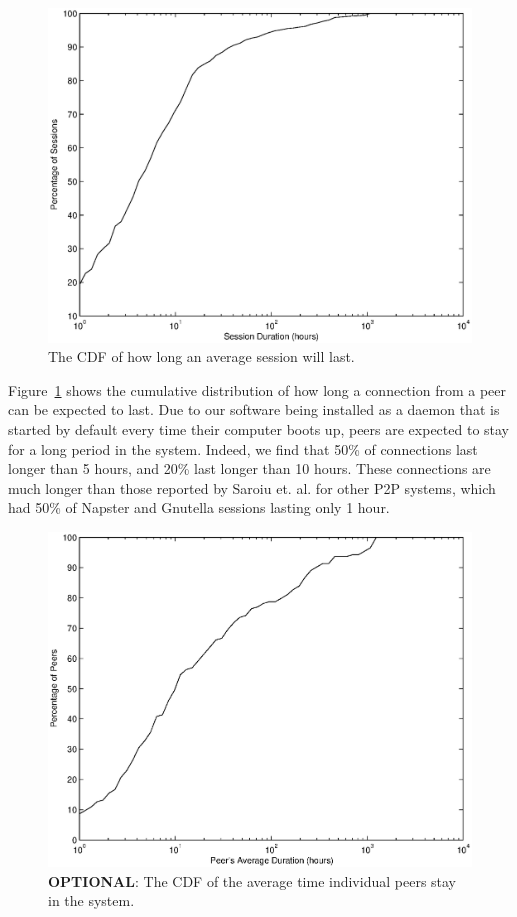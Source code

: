 \documentclass[conference]{IEEEtran}
\begin{document}
\begin{figure}
\centering
\includegraphics[width=\columnwidth]{AptP2PDuration-peers.eps}
\caption{The CDF of how long an average session will last.}
\label{duration_peers}
\end{figure}

Figure~\ref{duration_peers} shows the cumulative distribution of how
long a connection from a peer can be expected to last. Due to our
software being installed as a daemon that is started by default
every time their computer boots up, peers are expected to stay for a
long period in the system.
Indeed, we find that 50\% of connections last longer than 5
hours, and 20\% last longer than 10 hours. These connections are
much longer than those reported by Saroiu et. al. \cite{saroiu2001}
for other P2P systems, which had 50\% of Napster and Gnutella
sessions lasting only 1 hour.

\begin{figure}
\centering
\includegraphics[width=\columnwidth]{AptP2PDuration-ind_peers.eps}
\caption{\textbf{OPTIONAL}: The CDF of the average time individual peers stay in the
system.}
\label{duration_ind_peers}
\end{figure}
\end{document}

